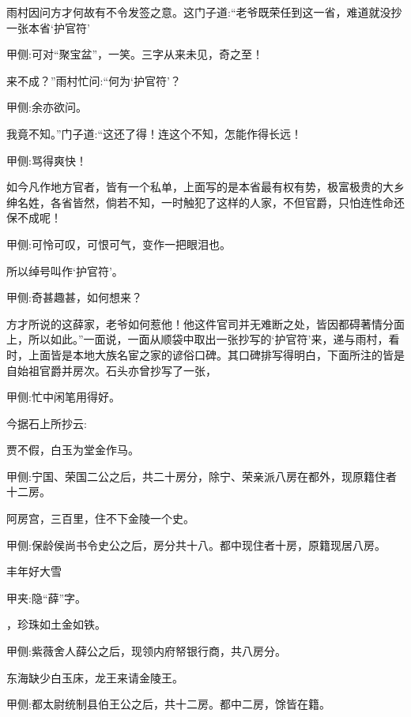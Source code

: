 \begin{parag}
    雨村因问方才何故有不令发签之意。这门子道:“老爷既荣任到这一省，难道就没抄一张本省‘护官符’\begin{note}甲侧:可对“聚宝盆”，一笑。三字从来未见，奇之至！\end{note}来不成？”雨村忙问:“何为‘护官符’？\begin{note}甲侧:余亦欲问。\end{note}我竟不知。”门子道:“这还了得！连这个不知，怎能作得长远！\begin{note}甲侧:骂得爽快！\end{note}如今凡作地方官者，皆有一个私单，上面写的是本省最有权有势，极富极贵的大乡绅名姓，各省皆然，倘若不知，一时触犯了这样的人家，不但官爵，只怕连性命还保不成呢！\begin{note}甲侧:可怜可叹，可恨可气，变作一把眼泪也。\end{note}所以绰号叫作‘护官符’。\begin{note}甲侧:奇甚趣甚，如何想来？\end{note}方才所说的这薛家，老爷如何惹他！他这件官司并无难断之处，皆因都碍著情分面上，所以如此。”一面说，一面从顺袋中取出一张抄写的‘护官符’来，递与雨村，看时，上面皆是本地大族名宦之家的谚俗口碑。其口碑排写得明白，下面所注的皆是自始祖官爵并房次。石头亦曾抄写了一张，\begin{note}甲侧:忙中闲笔用得好。\end{note}今据石上所抄云:
\end{parag}


\begin{poem}
    \begin{pl}贾不假，白玉为堂金作马。\end{pl}
    \begin{note}甲侧:宁国、荣国二公之后，共二十房分，除宁、荣亲派八房在都外，现原籍住者十二房。\end{note}

    \begin{pl}阿房宫，三百里，住不下金陵一个史。\end{pl}
    \begin{note}甲侧:保龄侯尚书令史公之后，房分共十八。都中现住者十房，原籍现居八房。\end{note}

    \begin{pl}丰年好大雪\end{pl}\begin{note}甲夹:隐“薛”字。\end{note} \begin{pl}，珍珠如土金如铁。\end{pl}

    \begin{note}甲侧:紫薇舍人薛公之后，现领内府帑银行商，共八房分。\end{note}

    \begin{pl}东海缺少白玉床，龙王来请金陵王。\end{pl}\begin{note}甲侧:都太尉统制县伯王公之后，共十二房。都中二房，馀皆在籍。\end{note}

\end{poem}


